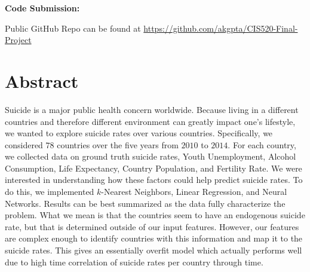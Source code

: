 \documentclass{article}
\begin{document}
\vspace{12pt}

\textbf{Code Submission:}

\normalsize{Public GitHub Repo can be found at \href{https://github.com/akgpta/CIS520-Final-Project}{https://github.com/akgpta/CIS520-Final-Project}}



\newpage
{
\hypersetup{linkcolor=blue}
\tableofcontents
}
\newpage

\section{Abstract}
Suicide is a major public health concern worldwide. Because living in a different countries and therefore different environment can greatly impact one's lifestyle, we wanted to explore suicide rates over various countries. Specifically, we considered $78$ countries over the five years from $2010$ to $2014$. For each country, we collected data on ground truth suicide rates, Youth Unemployment, Alcohol Consumption, Life Expectancy, Country Population, and Fertility Rate. We were interested in understanding how these factors could help predict suicide rates. To do this, we implemented $k$-Nearest Neighbors, Linear Regression, and Neural Networks. Results can be best summarized as the data fully characterize the problem. What we mean is that the countries seem to have an endogenous suicide rate, but that is determined outside of our input features. However, our features are complex enough to identify countries with this information and map it to the suicide rates. This gives an essentially overfit model which actually performs well due to high time correlation of suicide rates per country through time. 
\end{document}
